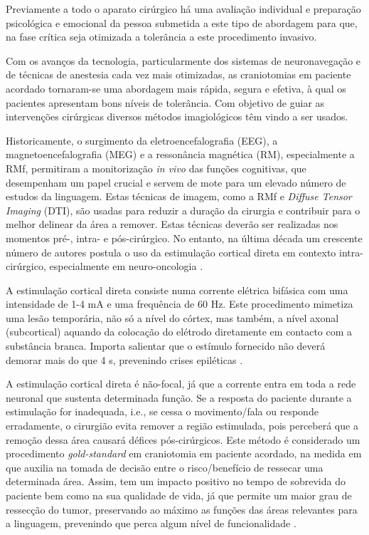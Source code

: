 \documentclass[output=paper,colorlinks,citecolor=brown,booklanguage=portuguese]{langscibook}
\begin{document}
Previamente a todo o aparato cirúrgico há uma avaliação individual e preparação psicológica e emocional da pessoa submetida a este tipo de abordagem para que, na fase crítica seja otimizada a tolerância a este procedimento invasivo.

Com os avanços da tecnologia, particularmente dos sistemas de neuronavegação e de técnicas de anestesia cada vez mais otimizadas, as craniotomias em paciente acordado tornaram-se uma abordagem mais rápida, segura e efetiva, à qual os pacientes apresentam bons níveis de tolerância. Com objetivo de guiar as intervenções cirúrgicas diversos métodos imagiológicos têm vindo a ser usados.

Historicamente, o surgimento da eletroencefalografia (EEG), a magnetoencefalografia (MEG) e a ressonância magnética (RM), especialmente a RMf, permitiram a monitorização \emph{in vivo} das funções cognitivas, que desempenham um papel crucial e servem de mote para um elevado número de estudos da linguagem. Estas técnicas de imagem, como a RMf e \emph{Diffuse Tensor Imaging} (DTI), são usadas para reduzir a duração da cirurgia e contribuir para o melhor delinear da área a remover. Estas técnicas deverão ser realizadas nos momentos pré-, intra- e pós-cirúrgico. No entanto, na última década um crescente número de autores postula o uso da estimulação cortical direta em contexto intra-cirúrgico, especialmente em neuro-oncologia \citep{Mandonnet2010}.  

A estimulação cortical direta consiste numa corrente elétrica bifásica com uma intensidade de 1-4 mA e uma frequência de 60 Hz. Este procedimento mimetiza uma lesão temporária, não só a nível do córtex, mas também, a nível axonal (subcortical) aquando da colocação do elétrodo diretamente em contacto com a substância branca. Importa salientar que o estímulo fornecido não deverá demorar mais do que 4 s, prevenindo crises epiléticas \citep{Duffau2016}.

A estimulação cortical direta é não-focal, já que a corrente entra em toda a rede neuronal que sustenta determinada função. Se a resposta do paciente durante a estimulação for inadequada, i.e., se cessa o movimento/fala ou responde erradamente, o cirurgião evita remover a região estimulada, pois perceberá que a remoção dessa área causará défices pós-cirúrgicos. Este método é considerado um procedimento \emph{gold-standard} em craniotomia em paciente acordado, na medida em que auxilia na tomada de decisão entre o risco/benefício de ressecar uma determinada área. Assim, tem um impacto positivo no tempo de sobrevida do paciente bem como na sua qualidade de vida, já que permite um maior grau de ressecção do tumor, preservando ao máximo as funções das áreas relevantes para a linguagem, prevenindo que perca algum nível de funcionalidade \citep{Duffau2016}. 
\end{document}
